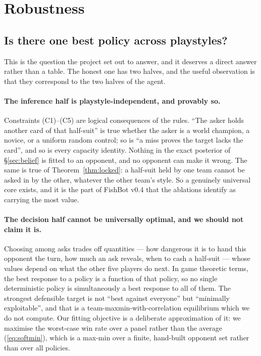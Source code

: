 \section{Robustness}
\label{sec:robustness}

\subsection{Is there one best policy across playstyles?}
\label{sec:oneBest}

This is the question the project set out to answer, and it deserves a direct
answer rather than a table. The honest one has two halves, and the useful
observation is that they correspond to the two halves of the agent.

\paragraph{The inference half is playstyle-independent, and provably so.}
Constraints (C1)--(C5) are logical consequences of the rules. ``The asker holds
another card of that half-suit'' is true whether the asker is a world champion,
a novice, or a uniform random control; so is ``a miss proves the target lacks
the card'', and so is every capacity identity. Nothing in the exact posterior of
\S\ref{sec:belief} is fitted to an opponent, and no opponent can make it wrong.
The same is true of Theorem~\ref{thm:locked}: a half-suit held by one team cannot
be asked in by the other, whatever the other team's style. So a genuinely
universal core exists, and it is the part of FishBot v0.4 that the ablations
identify as carrying the most value.

\paragraph{The decision half cannot be universally optimal, and we should not
claim it is.} Choosing among asks trades off quantities --- how dangerous it is
to hand this opponent the turn, how much an ask reveals, when to cash a
half-suit --- whose values depend on what the other five players do next. In game
theoretic terms, the best response to a policy is a function of that policy, so
no single deterministic policy is simultaneously a best response to all of them.
The strongest defensible target is not ``best against everyone'' but
``minimally exploitable'', and that is a team-maxmin-with-correlation equilibrium
which we do not compute. Our fitting objective is a deliberate approximation of
it: we maximise the worst-case win rate over a panel rather than the average
(\eqref{eq:softmin}), which is a max-min over a finite, hand-built opponent set
rather than over all policies.

